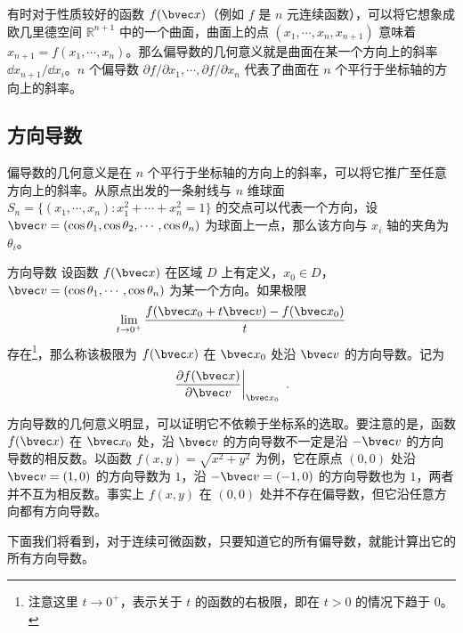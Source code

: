有时对于性质较好的函数 $f(\bvec x)$（例如 $f$ 是 $n$ 元连续函数），可以将它想象成欧几里德空间 $\mathbb{R}^{n+1}$ 中的一个曲面，曲面上的点 $(x_1,\cdots,x_n,x_{n+1})$ 意味着 $x_{n+1}=f(x_1,\cdots,x_n)$。那么偏导数的几何意义就是曲面在某一个方向上的斜率 $\dd x_{n+1}/\dd x_i$。$n$ 个偏导数 $\partial f/\partial x_1,\cdots,\partial f/\partial x_n$ 代表了曲面在 $n$ 个平行于坐标轴的方向上的斜率。

\subsection{方向导数}
偏导数的几何意义是在 $n$ 个平行于坐标轴的方向上的斜率，可以将它推广至任意方向上的斜率。从原点出发的一条射线与 $n$ 维球面 $S_n=\{(x_1,\cdots,x_n):x_1^2+\cdots+x_n^2=1\}$ 的交点可以代表一个方向，设 $\bvec v=(\cos \theta_1,\cos\theta_2,\cdots,\cos\theta_n)$ 为球面上一点，那么该方向与 $x_i$ 轴的夹角为 $\theta_i$。
\begin{definition}{方向导数}
设函数 $f(\bvec x)$ 在区域 $D$ 上有定义，$x_0\in D$，$\bvec v=(\cos \theta_1,\cdots,\cos\theta_n)$ 为某一个方向。如果极限
\begin{equation}
\lim\limits_{t\rightarrow 0^+}\frac{f(\bvec x_0+t\bvec v)-f(\bvec x_0)}{t}
\end{equation}
存在\footnote{注意这里 $t\rightarrow 0^+$，表示关于 $t$ 的函数的右极限，即在 $t>0$ 的情况下趋于 $0$。}，那么称该极限为 $f(\bvec x)$ 在 $\bvec x_0$ 处沿 $\bvec v$ 的方向导数。记为
\begin{equation}
\left.\frac{\partial f(\bvec x)}{\partial \bvec v}\right|_{\bvec x_0}~.
\end{equation}
\end{definition}

方向导数的几何意义明显，可以证明它不依赖于坐标系的选取。要注意的是，函数 $f(\bvec x)$ 在 $\bvec x_0$ 处，沿 $\bvec v$ 的方向导数不一定是沿 $-\bvec v$ 的方向导数的相反数。以函数 $f(x,y)=\sqrt{x^2+y^2}$ 为例，它在原点 $(0,0)$ 处沿 $\bvec v=(1,0)$ 的方向导数为 $1$，沿 $-\bvec v=(-1,0)$ 的方向导数也为 $1$，两者并不互为相反数。事实上 $f(x,y)$ 在 $(0,0)$ 处并不存在偏导数，但它沿任意方向都有方向导数。

下面我们将看到，对于连续可微函数，只要知道它的所有偏导数，就能计算出它的所有方向导数。
